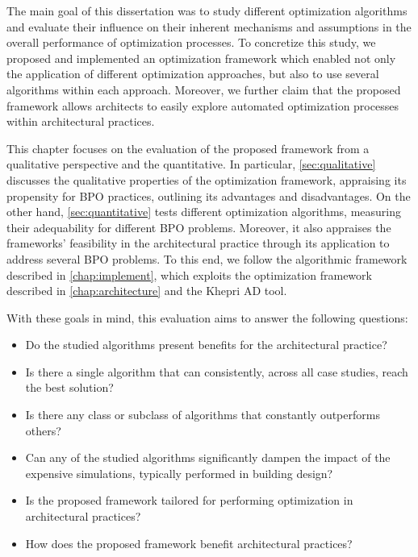 \label{chap:evaluation}
 
The main goal of this dissertation was to study different optimization algorithms and evaluate their influence on their inherent mechanisms and assumptions in the overall performance of optimization processes. To concretize this study, we proposed and implemented an optimization framework which enabled not only the application of different optimization approaches, but also to use several algorithms within each approach.  Moreover, we further claim that the proposed framework allows architects to easily explore automated optimization processes within architectural practices. 

This chapter focuses on the evaluation of the proposed framework from a qualitative perspective and the quantitative. In particular, \cref{sec:qualitative} discusses the qualitative properties of the optimization framework, appraising its propensity for \ac{BPO} practices, outlining its advantages and disadvantages. On the other hand, \cref{sec:quantitative} tests different optimization algorithms, measuring their adequability for different \ac{BPO} problems. Moreover, it also appraises the frameworks' feasibility in the architectural practice through its application to address several \ac{BPO} problems. To this end, we follow the algorithmic framework described in \cref{chap:implement}, which exploits the optimization framework described in \cref{chap:architecture} and the Khepri \ac{AD} tool. 

With these goals in mind, this evaluation aims to answer the following questions: 
\begin{itemize}
	\item Do the studied algorithms present benefits for the architectural practice? 
	\item Is there a single algorithm that can consistently, across all case studies, reach the best solution?
	\item Is there any class or subclass of algorithms that constantly outperforms others?
	\item Can any of the studied algorithms significantly dampen the impact of the expensive simulations, typically performed in building design? 
	\item Is the proposed framework tailored for performing optimization in architectural practices? 
	\item How does the proposed framework benefit architectural practices?
\end{itemize}


